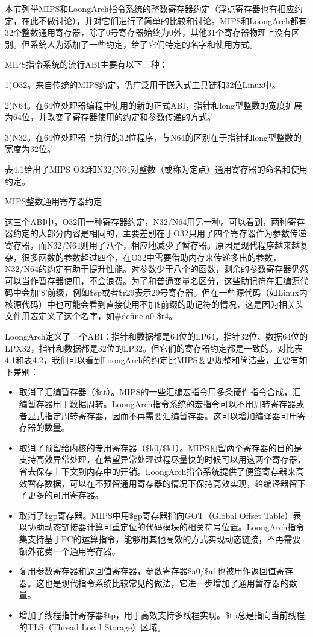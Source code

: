\documentclass[]{ctexbook}
\begin{document}
本节列举MIPS和LoongArch指令系统的整数寄存器约定（浮点寄存器也有相应约定，在此不做讨论），并对它们进行了简单的比较和讨论。MIPS和LoongArch都有32个整数通用寄存器，除了0号寄存器始终为0外，其他31个寄存器物理上没有区别。但系统人为添加了一些约定，给了它们特定的名字和使用方式。

MIPS指令系统的流行ABI主要有以下三种：

1)O32。来自传统的MIPS约定，仍广泛用于嵌入式工具链和32位Linux中。

2)N64。在64位处理器编程中使用的新的正式ABI，指针和long型整数的宽度扩展为64位，并改变了寄存器使用的约定和参数传递的方式。

3)N32。在64位处理器上执行的32位程序，与N64的区别在于指针和long型整数的宽度为32位。

表4.1给出了MIPS O32和N32/N64对整数（或称为定点）通用寄存器的命名和使用约定。

\label{tab:mips-reg}MIPS整数通用寄存器约定

这三个ABI中，O32用一种寄存器约定，N32/N64用另一种。可以看到，两种寄存器约定的大部分内容是相同的，主要差别在于O32只用了四个寄存器作为参数传递寄存器，而N32/N64则用了八个，相应地减少了暂存器。原因是现代程序越来越复杂，很多函数的参数超过四个，在O32中需要借助内存来传递多出的参数，N32/N64的约定有助于提升性能。对参数少于八个的函数，剩余的参数寄存器仍然可以当作暂存器使用，不会浪费。为了和普通变量名区分，这些助记符在汇编源代码中会加'\$'前缀，例如\$sp或者\$r29表示29号寄存器。但在一些源代码（如Linux内核源代码）中也可能会看到直接使用不加\$前缀的助记符的情况，这是因为相关头文件用宏定义了这个名字，如\#define a0 \$r4。

LoongArch定义了三个ABI：指针和数据都是64位的LP64，指针32位、数据64位的LPX32，指针和数据都是32位的LP32。但它们的寄存器约定都是一致的。对比表4.1和表4.2，我们可以看到LoongArch的约定比MIPS要更规整和简洁些，主要有如下差别：

\begin{itemize}
\item
  取消了汇编暂存器（\$at）。MIPS的一些汇编宏指令用多条硬件指令合成，汇编暂存器用于数据周转。LoongArch指令系统的宏指令可以不用周转寄存器或者显式指定周转寄存器，因而不再需要汇编暂存器。这可以增加编译器可用寄存器的数量。
\item
  取消了预留给内核的专用寄存器（\$k0/\$k1）。MIPS预留两个寄存器的目的是支持高效异常处理，在希望异常处理过程尽量快的时候可以用这两个寄存器，省去保存上下文到内存中的开销。LoongArch指令系统提供了便签寄存器来高效暂存数据，可以在不预留通用寄存器的情况下保持高效实现，给编译器留下了更多的可用寄存器。
\item
  取消了\$gp寄存器。MIPS中用\$gp寄存器指向GOT（Global Offset Table）表以协助动态链接器计算可重定位的代码模块的相关符号位置。LoongArch指令集支持基于PC的运算指令，能够用其他高效的方式实现动态链接，不再需要额外花费一个通用寄存器。
\item
  复用参数寄存器和返回值寄存器，参数寄存器\$a0/\$a1也被用作返回值寄存器。这也是现代指令系统比较常见的做法，它进一步增加了通用暂存器的数量。
\item
  增加了线程指针寄存器\$tp，用于高效支持多线程实现。\$tp总是指向当前线程的TLS（Thread Local Storage）区域。
\end{itemize}
\end{document}
